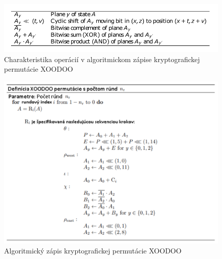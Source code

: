 \begin{figure}[!h]
	\centering
	\includegraphics[width=1.0\textwidth]{figures/tab1}
	\caption{Charakteristika operácií v algoritmickom zápise kryptografickej permutácie XOODOO \cite{xcb}}
	\label{tab1}
\end{figure}

\begin{figure}[h!]
  	\centering
  	\includegraphics[width=1.0\textwidth]{figures/xoodooalgo}
  	\caption{Algoritmický zápis kryptografickej permutácie XOODOO \cite{xcb}}
  	\label{xoodooalgo}
\end{figure}


\begin{table}[!h]
	\centering
	\caption{Súbor rundových konštánt kryptografického algoritmu \\ XOODOO \cite{xcb}}\label{tab2}
\end{table}


